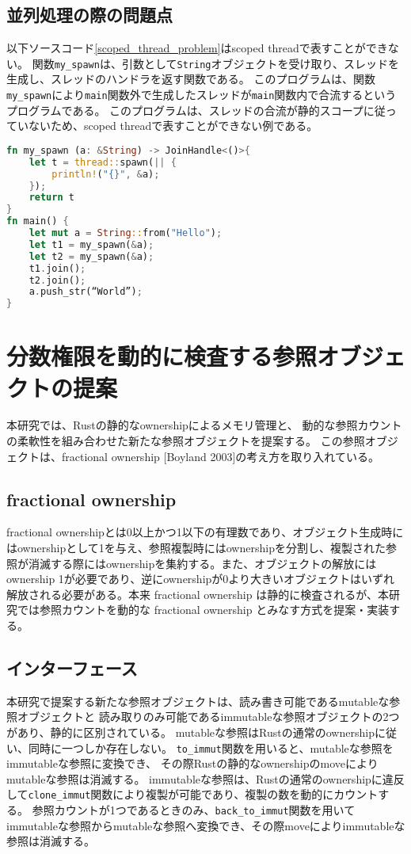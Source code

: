 \documentclass{sumiilab-paper}
\theoremstyle{mystyle}
\numberwithin{definition}{chapter} %
\begin{document}
\section{並列処理の際の問題点}
以下ソースコード\ref{scoped_thread_problem}はscoped threadで表すことができない。
関数\texttt{my\_spawn}は、引数として\texttt{String}オブジェクトを受け取り、スレッドを生成し、スレッドのハンドラを返す関数である。
このプログラムは、関数\texttt{my\_spawn}により\texttt{main}関数外で生成したスレッドが\texttt{main}関数内で合流するというプログラムである。
このプログラムは、スレッドの合流が静的スコープに従っていないため、scoped threadで表すことができない例である。
\begin{lstlisting}[language=Rust, caption=scoped threadで表せない例, label=scoped_thread_problem, captionpos=b]
fn my_spawn (a: &String) -> JoinHandle<()>{
    let t = thread::spawn(|| {
        println!("{}", &a);
    });
    return t
}
fn main() {
    let mut a = String::from("Hello");
    let t1 = my_spawn(&a);
    let t2 = my_spawn(&a);
    t1.join();
    t2.join();
    a.push_str(“World”);
}
\end{lstlisting}

\chapter{分数権限を動的に検査する参照オブジェクトの提案}
本研究では、Rustの静的なownershipによるメモリ管理と、
動的な参照カウントの柔軟性を組み合わせた新たな参照オブジェクトを提案する。
この参照オブジェクトは、fractional ownership [Boyland 2003]の考え方を取り入れている。

\section{fractional ownership}
fractional ownershipとは0以上かつ1以下の有理数であり、オブジェクト生成時にはownershipとして1を与え、参照複製時にはownershipを分割し、複製された参照が消滅する際にはownershipを集約する。また、オブジェクトの解放にはownership 1が必要であり、逆にownershipが0より大きいオブジェクトはいずれ解放される必要がある。本来 fractional ownership は静的に検査されるが、本研究では参照カウントを動的な fractional ownership とみなす方式を提案・実装する。

\section{インターフェース}
本研究で提案する新たな参照オブジェクトは、読み書き可能であるmutableな参照オブジェクトと
読み取りのみ可能であるimmutableな参照オブジェクトの2つがあり、静的に区別されている。
mutableな参照はRustの通常のownershipに従い、同時に一つしか存在しない。
\texttt{to\_immut}関数を用いると、mutableな参照をimmutableな参照に変換でき、
その際Rustの静的なownershipのmoveによりmutableな参照は消滅する。
immutableな参照は、Rustの通常のownershipに違反して\texttt{clone\_immut}関数により複製が可能であり、複製の数を動的にカウントする。
参照カウントが1つであるときのみ、\texttt{back\_to\_immut}関数を用いてimmutableな参照からmutableな参照へ変換でき、その際moveによりimmutableな参照は消滅する。
\end{document}
